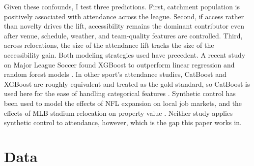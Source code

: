 \documentclass[9pt,twoside]{pnas-new}
\begin{document}
Given these confounds, I test three predictions. First, catchment population is positively associated with attendance across the league. Second, if access rather than novelty drives the lift, accessibility remains the dominant contributor even after venue, schedule, weather, and team-quality features are controlled. Third, across relocations, the size of the attendance lift tracks the size of the accessibility gain.
Both modeling strategies used have precedent. A recent study on Major League Soccer found XGBoost to outperform linear regression and random forest models \cite{Beermann25012026}. In other sport's attendance studies, CatBoost and XGBoost are roughly equivalent and treated as the gold standard, so CatBoost is used here for the ease of handling categorical features \cite{articleCatBoost}. Synthetic control has been used to model the effects of NFL expansion on local job markets, and the effects of MLB stadium relocation on property value \cite{repec:sae:jospec:v:20:y:2019:i:2:p:242-260} \cite{repec:spr:ecogov:v:23:y:2022:i:3:d:10.1007_s10101-022-00268-z}. Neither study applies synthetic control to attendance, however, which is the gap this paper works in.


\section{Data}
\end{document}
